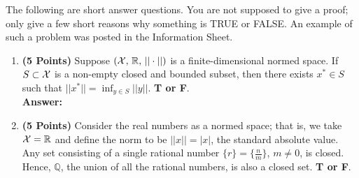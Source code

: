 \documentclass[letterpaper]{article}
\newcommand{\real}{\mathbb R}  %
\begin{document}
  The following are short answer questions. You are not supposed to give a proof; only give a few short reasons why something is TRUE or FALSE. An example of such a problem was posted in the Information Sheet.

\begin{enumerate}
\setlength{\itemsep}{.15in}
\renewcommand{\labelenumi}{(\alph{enumi})}
\setlength{\itemsep}{.1in}

%

\item \textbf{(5 Points)} Suppose $({\cal X},\,\real,\, || \cdot||)$ is a finite-dimensional normed space.  If $S \subset {\cal X}$ is a non-empty closed and bounded subset, then there exists $x^* \in S$ such that $||x^*||=\inf_{y\in S} ||y||$. \textbf{ T or F}.\\

    \textbf{Answer:}

\vspace*{6cm}




\item \textbf{(5 Points)}  Consider the real numbers as a normed space; that is, we take  ${\cal X} = \real$ and define the norm to be $||x|| = |x|$, the standard absolute value. Any set consisting of a single rational number $\{r\}=\{\frac{n}{m}\}$, $m\neq 0$, is closed. Hence, $\mathbb{Q}$, the union of all the rational numbers, is also a closed set. \textbf{ T or F}.\\


\end{enumerate}
\end{document}
